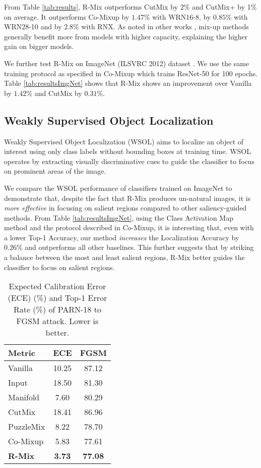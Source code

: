 \documentclass[letterpaper]{article} \usepackage[submission]{aaai23}  \usepackage{times}  \usepackage{helvet}  \usepackage{courier}  \usepackage[hyphens]{url}  \usepackage{graphicx} \urlstyle{rm} \def\UrlFont{\rm}  \usepackage{natbib}  \usepackage{caption} \frenchspacing  \setlength{\pdfpagewidth}{8.5in} \setlength{\pdfpageheight}{11in}
\newcommand{\cutmix}{{CutMix}}
\newcommand{\comixup}{{Co-Mixup}}
\newcommand{\rrlmix}{{R-Mix}}
\newcommand{\imagenet}{ImageNet}
\begin{document}
From Table \ref{tab:results}, \rrlmix{} outperforms \cutmix{} by $2\%$ and \cutmix{}+ by 1\% on average. It outperforms \comixup{} by $1.47\%$ with WRN16-8, by $0.85\%$ with WRN28-10 and by $2.8\%$ with RNX. As noted in other works \cite{zhang2018mixup}, mix-up methods generally benefit more from models with higher capacity, explaining the higher gain on bigger models.



We further test \rrlmix{} on \imagenet{} (ILSVRC 2012) dataset \cite{Russakovski2015ImageNet}. We use the same training protocol as specified in \comixup{} which trains ResNet-50 for 100 epochs. Table \ref{tab:resultsImgNet} shows that \rrlmix{} shows an improvement over Vanilla by $1.42\%$ and \cutmix{} by $0.31\%$.





\subsection{Weakly Supervised Object Localization}
Weakly Supervised Object Localization (WSOL) aims to localize an object of interest using only class labels without bounding boxes at training time. WSOL operates by extracting visually discriminative cues to guide the classifier to focus on prominent areas of the image.

We compare the WSOL performance of classifiers trained on \imagenet{} to demonstrate that, despite the fact that \rrlmix{} produces un-natural images, it is \emph{more effective} in focusing on salient regions compared to other saliency-guided methods. From Table \ref{tab:resultsImgNet}, using the Class Activation Map method \cite{zhou2015learning} and the protocol described in \comixup{}, it is interesting that, even with a lower Top-1 Accuracy, our method \emph{increases} the Localization Accuracy by $0.26\%$ and outperforms all other baselines. This further suggests that by striking a balance between the most and least salient regions, \rrlmix{} better guides the classifier to focus on salient regions.

\begin{table}[h!]
\centering
\begin{tabular}{lcc}
\hline
Metric & ECE & FGSM \\ \hline
Vanilla & 10.25 & 87.12 \\
Input & 18.50 & 81.30 \\
Manifold & 7.60 & 80.29 \\
CutMix & 18.41 & 86.96 \\
PuzzleMix & 8.22 & 78.70 \\ 
Co-Mixup & 5.83 & 77.61 \\\hline
\textbf{R-Mix} & \textbf{3.73} & \textbf{77.08} \\ \hline
\end{tabular}
\caption{Expected Calibration Error (ECE) (\%) and Top-1 Error Rate (\%) of PARN-18 to FGSM attack. Lower is better.}
\label{tab:ecefgsm}
\end{table}
\end{document}
